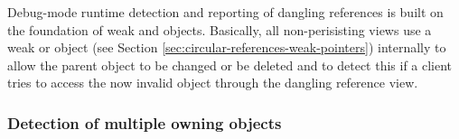 \documentclass[pdf,ps2pdf,11pt]{SANDreport}
\begin{document}
Debug-mode runtime detection and reporting of dangling references is
built on the foundation of weak {} and {}
objects.  Basically, all non-perisisting views use a weak
{} or {} object (see Section
{}\ref{sec:circular-references-weak-pointers}) internally to allow the
parent object to be changed or be deleted and to detect this if a
client tries to access the now invalid object through the dangling
reference view.


%
{}\subsubsection{Detection of multiple owning {} objects}
\label{sec:detection-dual-owning-rcps}
%

{\bsinglespace
\begin{figure}
\begin{center}

\end{center}
\end{figure}}
\end{document}
